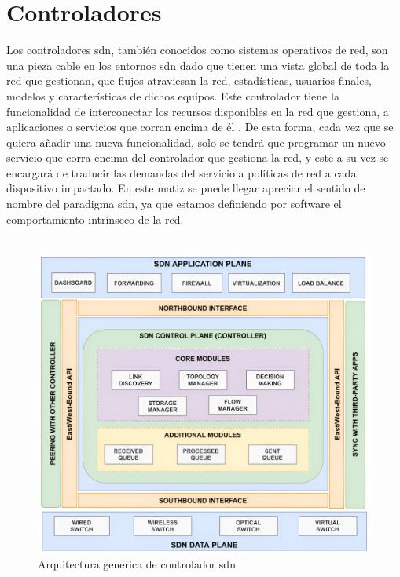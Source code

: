 \section{Controladores }
\label{sec:sdnControllers}

Los controladores \gls{sdn}, también conocidos como sistemas operativos de red, son una pieza cable en los entornos  \gls{sdn} dado que tienen una vista global de toda la red que gestionan, que flujos atraviesan la red, estadísticas, usuarios finales, modelos y características de dichos equipos. Este controlador tiene la funcionalidad de interconectar los recursos disponibles en la red que gestiona, a aplicaciones o servicios que corran encima de él \cite{nadeau2013sdn}. De esta forma, cada vez que se quiera añadir una nueva funcionalidad, solo se tendrá que programar un nuevo servicio que corra encima del controlador que gestiona la red, y este a su vez se encargará de traducir las demandas del servicio a políticas de red a cada dispositivo impactado. En este matiz se puede llegar apreciar el sentido de nombre del paradigma \gls{sdn}, ya que estamos definiendo por software el comportamiento intrínseco de la red.\\
\\
\begin{figure}[ht]
    \centering
    \includegraphics[width=\textwidth]{archivos/img/teoria/sdn_controllers.jpg}
    \caption{Arquitectura generica de controlador \gls{sdn} \cite{zhu2020sdn}}
    \label{fig:sdn_controllers}
\end{figure}


